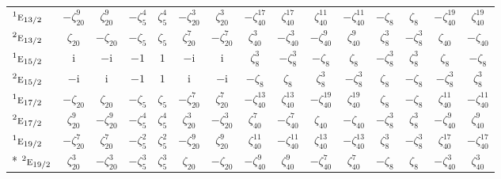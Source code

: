 \documentclass[10pt,a4paper]{article}
\numberwithin{equation}{section}
\newcommand{\irr}[1]{\text{\normalfont\scshape #1}}
\newcommand{\conjpair}[1]{{}^{#1}}
\newcommand{\iunit}{\mathrm{i}}
\newcommand{\rootunity}[1]{\zeta_{#1}}
\begin{document}
{\begin{longtable}{@{}lcccccccccccccc@{}}
$\conjpair{1}\irr{e}_{13/2}$ & $-\rootunity{20}^{9}$ & $\rootunity{20}^{9}$ & $-\rootunity{5}^{4}$ & $\rootunity{5}^{4}$ & $-\rootunity{20}^{3}$ & $\rootunity{20}^{3}$ & $-\rootunity{40}^{17}$ & $\rootunity{40}^{17}$ & $\rootunity{40}^{11}$ & $-\rootunity{40}^{11}$ & $-\rootunity{8}$ & $\rootunity{8}$ & $-\rootunity{40}^{19}$ & $\rootunity{40}^{19}$\\
$\conjpair{2}\irr{e}_{13/2}$ & $\rootunity{20}$ & $-\rootunity{20}$ & $-\rootunity{5}$ & $\rootunity{5}$ & $\rootunity{20}^{7}$ & $-\rootunity{20}^{7}$ & $\rootunity{40}^{3}$ & $-\rootunity{40}^{3}$ & $-\rootunity{40}^{9}$ & $\rootunity{40}^{9}$ & $\rootunity{8}^{3}$ & $-\rootunity{8}^{3}$ & $\rootunity{40}$ & $-\rootunity{40}$\\
$\conjpair{1}\irr{e}_{15/2}$ & $\iunit{}$ & $-\iunit{}$ & $-1$ & $1$ & $-\iunit{}$ & $\iunit{}$ & $\rootunity{8}^{3}$ & $-\rootunity{8}^{3}$ & $-\rootunity{8}$ & $\rootunity{8}$ & $-\rootunity{8}^{3}$ & $\rootunity{8}^{3}$ & $\rootunity{8}$ & $-\rootunity{8}$\\
$\conjpair{2}\irr{e}_{15/2}$ & $-\iunit{}$ & $\iunit{}$ & $-1$ & $1$ & $\iunit{}$ & $-\iunit{}$ & $-\rootunity{8}$ & $\rootunity{8}$ & $\rootunity{8}^{3}$ & $-\rootunity{8}^{3}$ & $\rootunity{8}$ & $-\rootunity{8}$ & $-\rootunity{8}^{3}$ & $\rootunity{8}^{3}$\\
$\conjpair{1}\irr{e}_{17/2}$ & $-\rootunity{20}$ & $\rootunity{20}$ & $-\rootunity{5}$ & $\rootunity{5}$ & $-\rootunity{20}^{7}$ & $\rootunity{20}^{7}$ & $-\rootunity{40}^{13}$ & $\rootunity{40}^{13}$ & $-\rootunity{40}^{19}$ & $\rootunity{40}^{19}$ & $\rootunity{8}$ & $-\rootunity{8}$ & $\rootunity{40}^{11}$ & $-\rootunity{40}^{11}$\\
$\conjpair{2}\irr{e}_{17/2}$ & $\rootunity{20}^{9}$ & $-\rootunity{20}^{9}$ & $-\rootunity{5}^{4}$ & $\rootunity{5}^{4}$ & $\rootunity{20}^{3}$ & $-\rootunity{20}^{3}$ & $\rootunity{40}^{7}$ & $-\rootunity{40}^{7}$ & $\rootunity{40}$ & $-\rootunity{40}$ & $-\rootunity{8}^{3}$ & $\rootunity{8}^{3}$ & $-\rootunity{40}^{9}$ & $\rootunity{40}^{9}$\\
$\conjpair{1}\irr{e}_{19/2}$ & $-\rootunity{20}^{7}$ & $\rootunity{20}^{7}$ & $-\rootunity{5}^{2}$ & $\rootunity{5}^{2}$ & $-\rootunity{20}^{9}$ & $\rootunity{20}^{9}$ & $\rootunity{40}^{11}$ & $-\rootunity{40}^{11}$ & $\rootunity{40}^{13}$ & $-\rootunity{40}^{13}$ & $\rootunity{8}^{3}$ & $-\rootunity{8}^{3}$ & $\rootunity{40}^{17}$ & $-\rootunity{40}^{17}$\\*
$\conjpair{2}\irr{e}_{19/2}$ & $\rootunity{20}^{3}$ & $-\rootunity{20}^{3}$ & $-\rootunity{5}^{3}$ & $\rootunity{5}^{3}$ & $\rootunity{20}$ & $-\rootunity{20}$ & $-\rootunity{40}^{9}$ & $\rootunity{40}^{9}$ & $-\rootunity{40}^{7}$ & $\rootunity{40}^{7}$ & $-\rootunity{8}$ & $\rootunity{8}$ & $-\rootunity{40}^{3}$ & $\rootunity{40}^{3}$\\
\bottomrule\end{longtable}}
\end{document}
